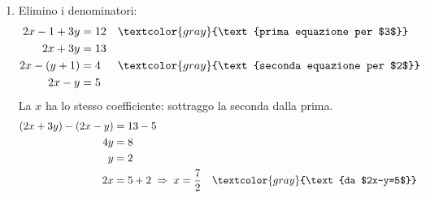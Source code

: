 \begin{question}[ID=1.3, subtitle={Sistemi lineari con parentesi e frazioni}, difficulty=media, tags={sistemi, equazioni lineari}]
\begin{explanation}
\begin{enumerate}
    \item Elimino i denominatori:
    \[\begin{aligned}
    2x-1+3y &= 12 && \textcolor{gray}{\text{prima equazione per $3$}}\\
    2x+3y &= 13\\
    2x-(y+1) &= 4 && \textcolor{gray}{\text{seconda equazione per $2$}}\\
    2x-y &= 5
    \end{aligned}\]
    La $x$ ha lo stesso coefficiente: sottraggo la seconda dalla prima.
    \[\begin{aligned}
    (2x+3y)-(2x-y) &= 13-5\\
    4y &= 8\\
    y &= 2\\
    2x &= 5+2 \;\Rightarrow\; x=\dfrac72 && \textcolor{gray}{\text{da $2x-y=5$}}
    \end{aligned}\]
\end{enumerate}
\end{explanation}
\end{question}


